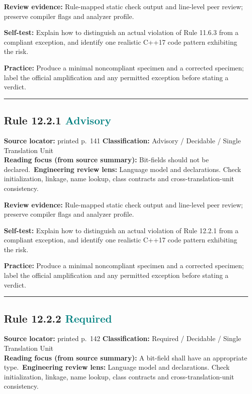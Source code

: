 \documentclass[10pt,letterpaper]{article}
\begin{document}
\textbf{Review evidence:} Rule-mapped static check output and line-level peer review; preserve compiler flags and analyzer profile.

\textbf{Self-test:} Explain how to distinguish an actual violation of Rule 11.6.3 from a compliant exception, and identify one realistic C++17 code pattern exhibiting the risk.\par
\textbf{Practice:} Produce a minimal noncompliant specimen and a corrected specimen; label the official amplification and any permitted exception before stating a verdict.
\smallskip\hrule\smallskip
\subsection*{Rule 12.2.1 \enspace \texorpdfstring{\small\textcolor{teal}{Advisory}}{Advisory}}
\noindent\textbf{Source locator:} printed p.~141 \quad\textbf{Classification:} Advisory / Decidable / Single Translation Unit\\
\textbf{Reading focus (from source summary):} Bit-fields should not be declared.\
\textbf{Engineering review lens:} Language model and declarations. Check initialization, linkage, name lookup, class contracts and cross-translation-unit consistency.

\textbf{Review evidence:} Rule-mapped static check output and line-level peer review; preserve compiler flags and analyzer profile.

\textbf{Self-test:} Explain how to distinguish an actual violation of Rule 12.2.1 from a compliant exception, and identify one realistic C++17 code pattern exhibiting the risk.\par
\textbf{Practice:} Produce a minimal noncompliant specimen and a corrected specimen; label the official amplification and any permitted exception before stating a verdict.
\smallskip\hrule\smallskip
\subsection*{Rule 12.2.2 \enspace \texorpdfstring{\small\textcolor{teal}{Required}}{Required}}
\noindent\textbf{Source locator:} printed p.~142 \quad\textbf{Classification:} Required / Decidable / Single Translation Unit\\
\textbf{Reading focus (from source summary):} A bit-field shall have an appropriate type.\
\textbf{Engineering review lens:} Language model and declarations. Check initialization, linkage, name lookup, class contracts and cross-translation-unit consistency.
\end{document}
